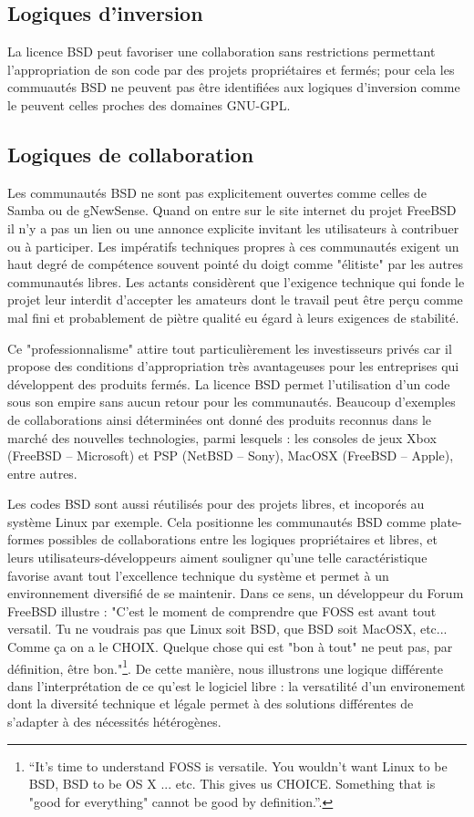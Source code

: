 \subsection{Logiques d'inversion}\label{3.2.3}

La licence BSD peut favoriser une collaboration sans restrictions permettant l'appropriation de son code par des projets propriétaires et fermés; pour cela les commuautés BSD ne peuvent pas être identifiées aux logiques d'inversion comme le peuvent celles proches des domaines GNU-GPL.

\subsection{Logiques de collaboration}\label{3.2.4}

Les communautés BSD ne sont pas explicitement ouvertes comme celles de Samba ou de gNewSense. Quand on entre sur le site internet du projet FreeBSD il n'y a pas un lien ou une annonce explicite invitant les utilisateurs à contribuer ou à participer. Les impératifs techniques propres à ces communautés exigent un haut degré de compétence souvent pointé du doigt comme "élitiste" par les autres communautés libres. Les actants considèrent que l'exigence technique qui fonde le projet leur interdit d'accepter les amateurs dont le travail peut être perçu comme mal fini et probablement de piètre qualité eu égard à leurs exigences de stabilité.

Ce "professionnalisme" attire tout particulièrement les investisseurs privés car il propose des conditions d'appropriation très avantageuses pour les entreprises qui développent des produits fermés. La licence BSD permet l'utilisation d'un code sous son empire sans aucun retour pour les communautés. Beaucoup d'exemples de collaborations ainsi déterminées ont donné des produits reconnus dans le marché des nouvelles technologies, parmi lesquels : les consoles de jeux Xbox (FreeBSD -- Microsoft) et PSP (NetBSD -- Sony), MacOSX (FreeBSD -- Apple), entre autres.

Les codes BSD sont aussi réutilisés pour des projets libres, et incoporés au système Linux par exemple. Cela positionne les communautés BSD comme plate-formes possibles de collaborations entre les logiques propriétaires et libres, et leurs utilisateurs-développeurs aiment souligner qu'une telle caractéristique favorise avant tout l'excellence technique du système et permet à un environnement diversifié de se maintenir. Dans ce sens, un développeur du Forum FreeBSD illustre : "C'est le moment de comprendre que FOSS est avant tout versatil. Tu ne voudrais pas que Linux soit BSD, que BSD soit MacOSX, etc... Comme ça on a le CHOIX. Quelque chose qui est "bon à tout" ne peut pas, par définition, être bon."\footnote{“It's time to understand FOSS is versatile. You wouldn't want Linux to be BSD, BSD to be OS X ... etc. This gives us CHOICE. Something that is "good for everything" cannot be good by definition.”.}. De cette manière, nous illustrons une logique différente dans l'interprétation de ce qu'est le logiciel libre : la versatilité d'un environement dont la diversité technique et légale permet à des solutions différentes de s'adapter à des nécessités hétérogènes.

